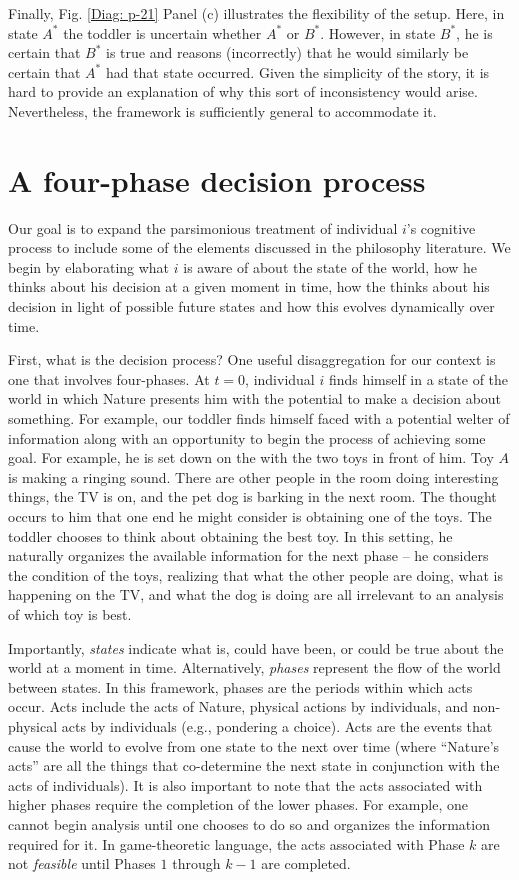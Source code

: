 \documentclass[
11pt,
titlepage,
reqno,
]{article}%
\theoremstyle{definition}
\begin{document}
Finally, Fig. \ref{Diag: p-21} Panel (c) illustrates the flexibility of the setup. Here, in state $A^\ast$ the toddler is uncertain whether $A^\ast$ or $B^\ast$. However, in state $B^\ast$, he is certain that $B^\ast$ is true and reasons (incorrectly) that he would similarly be certain that $A^\ast$ had that state occurred. Given the simplicity of the story, it is hard to provide an explanation of why this sort of inconsistency would arise. Nevertheless, the framework is sufficiently general to accommodate it.



\section*{A four-phase decision process}
Our goal is to expand the parsimonious treatment of individual $i$'s cognitive process to include some of the elements discussed in the philosophy literature. We begin by elaborating what $i$ is aware of about the state of the world, how he thinks about his decision at a given moment in time, how the thinks about his decision in light of possible future states and how this evolves dynamically over time. 

First, what is the decision process? One useful disaggregation for our context is one that involves four-phases. At $t=0$, individual $i$ finds himself in a state of the world in which Nature presents him with the potential to make a decision about something. For example, our toddler finds himself faced with a potential welter of information along with an opportunity to begin the process of achieving some goal. For example, he is set down on the with the two toys in front of him. Toy $A$ is making a ringing sound. There are other people in the room doing interesting things, the TV is on, and the pet dog is barking in the next room. The thought occurs to him that one end he might consider is  obtaining one of the toys. The toddler chooses to think about obtaining the best toy. In this setting, he naturally organizes the available information for the next phase -- he considers the condition of the toys, realizing that what the other people are doing, what is happening on the TV, and what the dog is doing are all irrelevant to an analysis of which toy is best.  

Importantly, \textit{states} indicate what is, could have been, or could be true about the world at a moment in time. Alternatively, \textit{phases} represent the flow of the world between states. In this framework, phases are the periods within which acts occur. Acts include the acts of Nature, physical actions by individuals, and non-physical acts by individuals (e.g., pondering a choice). Acts are the events that cause the world to evolve from one state to the next over time (where ``Nature's acts'' are all the things that co-determine the next state in conjunction with the acts of individuals). It is also important to note that the acts associated with higher phases require the completion of the lower phases. For example, one cannot begin analysis until one chooses to do so and organizes the information required for it. In game-theoretic language, the acts associated with Phase $k$ are not \textit{feasible} until Phases $1$ through $k-1$ are completed. 
\end{document}
